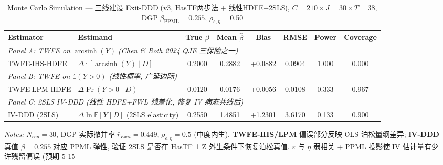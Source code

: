 \begin{table}[htbp]
\centering
\small
\caption{Monte Carlo Simulation --- 三线建设 Exit-DDD (v3, HasTF两步法 + 线性HDFE+2SLS), $C=210 \times J=30 \times T=38$, DGP $\beta_{\text{PPML}}=0.255$, $\rho_{\varepsilon,\eta}=$0.50}
\label{tab:mc_sim_v3}
\begin{tabular}{l l c c c c c c}
\toprule
Estimator & Estimand & True $\beta$ & Mean $\hat\beta$ & Bias & RMSE & Power & Coverage \\
\midrule
\multicolumn{8}{l}{\textit{Panel A: TWFE on $\operatorname{arcsinh}(Y)$ (Chen \& Roth 2024 QJE 三保险之一)}} \\
TWFE-IHS-HDFE & $\Delta \mathbb{E}[\operatorname{arcsinh}(Y) \mid D]$ & 0.2000 & 0.2882 & +0.0882 & 0.0904 & 1.000 & 0.000 \\
\multicolumn{8}{l}{\textit{Panel B: TWFE on $\mathbb{1}(Y>0)$ (线性概率, 广延边际)}} \\
TWFE-LPM-HDFE & $\Delta \Pr(Y>0 \mid D)$ & 0.0120 & 0.0176 & +0.0056 & 0.0108 & 0.333 & 0.967 \\
\multicolumn{8}{l}{\textit{Panel C: 2SLS IV-DDD (线性 HDFE+FWL 残差化, 修复 IV 病态共线后)}} \\
IV-DDD (2SLS) & $\Delta \ln \mathbb{E}[Y \mid D]$ (2SLS elasticity) & 0.2550 & 1.4851 & +1.2301 & 3.6170 & 0.133 & 0.900 \\
\bottomrule
\end{tabular}
\begin{flushleft}\footnotesize
\textit{Notes:} $N_{rep}=30$, DGP 实际撤并率 $\bar{r}_{Exit}=0.449$, $\rho_{\varepsilon,\eta}=0.5$ (中度内生). \textbf{TWFE-IHS/LPM} 偏误部分反映 OLS-泊松量纲差异; \textbf{IV-DDD} 真值 $\beta=0.255$ 对应 PPML 弹性, 验证 2SLS 是否在 HasTF$\perp$Z 外生条件下恢复泊松真值. $\varepsilon$ 与 $\eta$ 弱相关 + PPML 投影使 IV 估计量有少许残留偏误 (预期 5-15%
\end{flushleft}
\end{table}